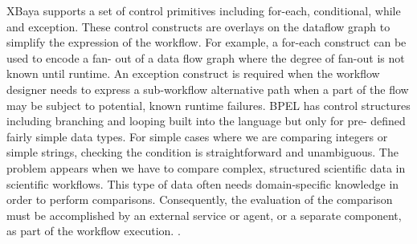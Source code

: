 XBaya supports a set of control primitives including for-each, conditional, while and exception. These control constructs are overlays on the dataflow graph to simplify the expression of the workflow. For example, a for-each construct can be used to encode a fan- out of a data flow graph where the degree of fan-out is not known until runtime. An exception construct is required when the workflow designer needs to express a sub-workflow alternative path when a part of the flow may be subject to potential, known runtime failures. BPEL has control structures including branching and looping built into the language but only for pre- defined fairly simple data types. For simple cases where we are comparing integers or simple strings, checking the condition is straightforward and unambiguous. The problem appears when we have to compare complex, structured scientific data in scientific workflows. This type of data often needs domain-specific knowledge in order to perform comparisons. Consequently, the evaluation of the comparison must be accomplished by an external service or agent, or a separate component, as part of the workflow execution. \cite{deelman2009workflows}.